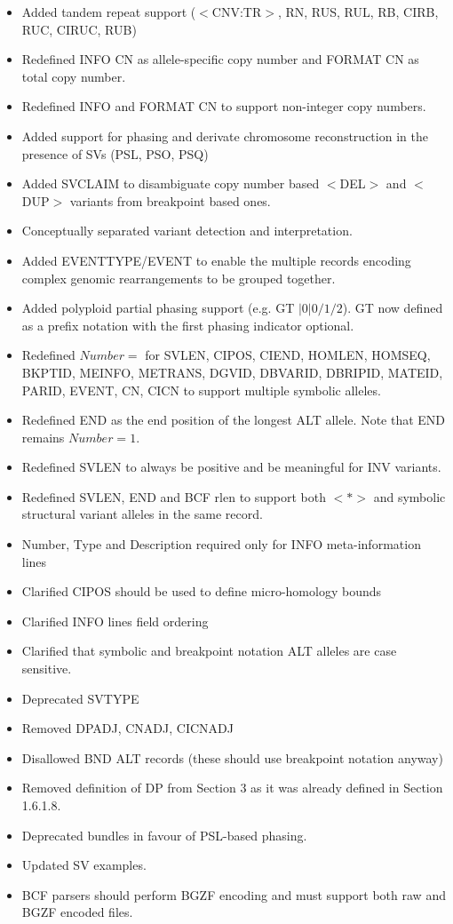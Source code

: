 \documentclass[8pt]{article}
\begin{document}
\begin{itemize}
\item Added tandem repeat support ($<$CNV:TR$>$, RN, RUS, RUL, RB, CIRB, RUC, CIRUC, RUB)
\item Redefined INFO CN as allele-specific copy number and FORMAT CN as total copy number.
\item Redefined INFO and FORMAT CN to support non-integer copy numbers.
\item Added support for phasing and derivate chromosome reconstruction in the presence of SVs (PSL, PSO, PSQ)
\item Added SVCLAIM to disambiguate copy number based $<$DEL$>$ and $<$DUP$>$ variants from breakpoint based ones.
\item Conceptually separated variant detection and interpretation.
\item Added EVENTTYPE/EVENT to enable the multiple records encoding complex genomic rearrangements to be grouped together.
\item Added polyploid partial phasing support (e.g. GT $|0|0/1/2$). GT now defined as a prefix notation with the first phasing indicator optional.
\item Redefined $Number=$ for SVLEN, CIPOS, CIEND, HOMLEN, HOMSEQ, BKPTID, MEINFO, METRANS, DGVID, DBVARID, DBRIPID, MATEID, PARID, EVENT, CN, CICN to support multiple symbolic alleles.
\item Redefined END as the end position of the longest ALT allele. Note that END remains $Number=1$.
\item Redefined SVLEN to always be positive and be meaningful for INV variants.
\item Redefined SVLEN, END and BCF rlen to support both $<*>$ and symbolic structural variant alleles in the same record.
\item Number, Type and Description required only for INFO meta-information lines
\item Clarified CIPOS should be used to define micro-homology bounds
\item Clarified INFO lines field ordering
\item Clarified that symbolic and breakpoint notation ALT alleles are case sensitive.
\item Deprecated SVTYPE
\item Removed DPADJ, CNADJ, CICNADJ
\item Disallowed BND ALT records (these should use breakpoint notation anyway)
\item Removed definition of DP from Section 3 as it was already defined in Section 1.6.1.8.
\item Deprecated bundles in favour of PSL-based phasing.
\item Updated SV examples.
\item BCF parsers should perform BGZF encoding and must support both raw and BGZF encoded files.
\end{itemize}
\end{document}

